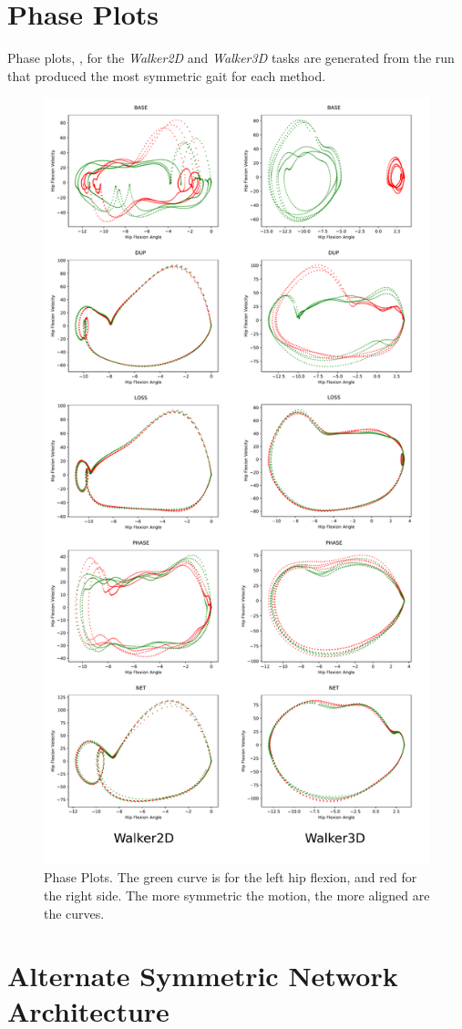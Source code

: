 \section{Phase Plots}
\label{sec:phase-plots}

Phase plots, , for the \textit{Walker2D} and \textit{Walker3D} tasks are generated from the run that produced the most symmetric gait for each method.  

\begin{figure}
  \centering
  \includegraphics[width=0.70\columnwidth]{symmetry_figures/phase_plots.pdf}
  \caption{Phase Plots.  The green curve is for the left hip flexion, and red for the right side.  The more symmetric the motion, the more aligned are the curves.}
  \label{fig:phase-plots}
\end{figure}

\section{Alternate Symmetric Network Architecture}
\label{sec:alternate-network}

